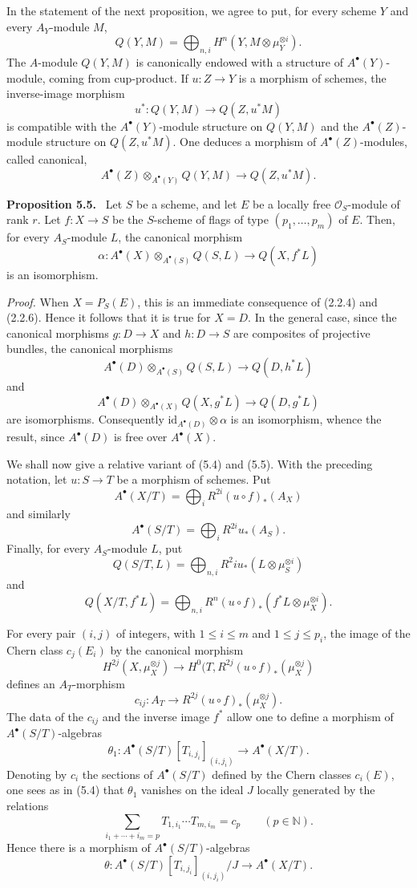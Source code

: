 \documentclass[11pt]{article}
\newenvironment{statement}[1]{\par\medskip\noindent\textbf{#1.}\ }{\par\medskip}
\begin{document}
In the statement of the next proposition, we agree to put, for every scheme $Y$ and every $A_Y$-module $M$,
\[
Q(Y,M)=\bigoplus_{n,i}H^n(Y,M\otimes\mu_Y^{\otimes i}).
\]
The $A$-module $Q(Y,M)$ is canonically endowed with a structure of $A^\bullet(Y)$-module, coming from cup-product. If $u:Z\to Y$ is a morphism of schemes, the inverse-image morphism
\[
u^*:Q(Y,M)\to Q(Z,u^*M)
\]
is compatible with the $A^\bullet(Y)$-module structure on $Q(Y,M)$ and the $A^\bullet(Z)$-module structure on $Q(Z,u^*M)$. One deduces a morphism of $A^\bullet(Z)$-modules, called canonical,
\[
A^\bullet(Z)\otimes_{A^\bullet(Y)}Q(Y,M)\to Q(Z,u^*M).
\]

\begin{statement}{Proposition 5.5}
Let $S$ be a scheme, and let $E$ be a locally free $\mathcal O_S$-module of rank $r$. Let $f:X\to S$ be the $S$-scheme of flags of type $(p_1,\ldots,p_m)$ of $E$. Then, for every $A_S$-module $L$, the canonical morphism
\[
\alpha:A^\bullet(X)\otimes_{A^\bullet(S)}Q(S,L)\to Q(X,f^*L)
\]
is an isomorphism.
\end{statement}

\emph{Proof.} When $X=P_S(E)$, this is an immediate consequence of (2.2.4) and (2.2.6). Hence it follows that it is true for $X=D$. In the general case, since the canonical morphisms $g:D\to X$ and $h:D\to S$ are composites of projective bundles, the canonical morphisms
\[
A^\bullet(D)\otimes_{A^\bullet(S)}Q(S,L)\to Q(D,h^*L)
\]
and
\[
A^\bullet(D)\otimes_{A^\bullet(X)}Q(X,g^*L)\to Q(D,g^*L)
\]
are isomorphisms. Consequently $\mathrm{id}_{A^\bullet(D)}\otimes\alpha$ is an isomorphism, whence the result, since $A^\bullet(D)$ is free over $A^\bullet(X)$.

We shall now give a relative variant of (5.4) and (5.5). With the preceding notation, let $u:S\to T$ be a morphism of schemes. Put
\[
A^\bullet(X/T)=\bigoplus_i R^{2i}(u\circ f)_*(A_X)
\]
and similarly
\[
A^\bullet(S/T)=\bigoplus_i R^{2i}u_*(A_S).
\]
Finally, for every $A_S$-module $L$, put
\[
Q(S/T,L)=\bigoplus_{n,i}R^2i u_*(L\otimes\mu_S^{\otimes i})
\]
and
\[
Q(X/T,f^*L)=\bigoplus_{n,i}R^n(u\circ f)_*(f^*L\otimes\mu_X^{\otimes i}).
\]

For every pair $(i,j)$ of integers, with $1\le i\le m$ and $1\le j\le p_i$, the image of the Chern class $c_j(E_i)$ by the canonical morphism
\[
H^{2j}(X,\mu_X^{\otimes j})
\to H^0(T,R^{2j}(u\circ f)_*(\mu_X^{\otimes j})
\]
defines an $A_T$-morphism
\[
c_{ij}:A_T\to R^{2j}(u\circ f)_*(\mu_X^{\otimes j}).
\]
The data of the $c_{ij}$ and the inverse image $f^*$ allow one to define a morphism of $A^\bullet(S/T)$-algebras
\[
\theta_1:A^\bullet(S/T)[T_{i,j_i}]_{(i,j_i)}\to A^\bullet(X/T).
\]
Denoting by $c_i$ the sections of $A^\bullet(S/T)$ defined by the Chern classes $c_i(E)$, one sees as in (5.4) that $\theta_1$ vanishes on the ideal $J$ locally generated by the relations
\[
\sum_{i_1+\cdots+i_m=p}T_{1,i_1}\cdots T_{m,i_m}=c_p\qquad(p\in\mathbb N).
\]
Hence there is a morphism of $A^\bullet(S/T)$-algebras
\[
\theta:A^\bullet(S/T)[T_{i,j_i}]_{(i,j_i)}/J\to A^\bullet(X/T).
\]
\end{document}
